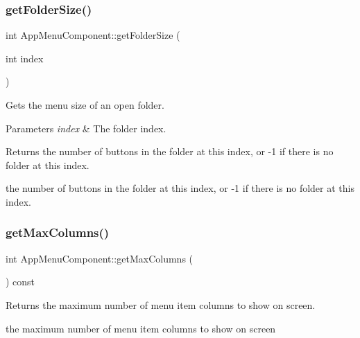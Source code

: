 \subsubsection{\texorpdfstring{get\+Folder\+Size()}{getFolderSize()}}
{\footnotesize\ttfamily int App\+Menu\+Component\+::get\+Folder\+Size (\begin{DoxyParamCaption}\item[{int}]{index }\end{DoxyParamCaption})\hspace{0.3cm}{\ttfamily [protected]}}

Gets the menu size of an open folder.


\begin{DoxyParams}{Parameters}
{\em index} & The folder index.\\
\hline
\end{DoxyParams}
\begin{DoxyReturn}{Returns}
the number of buttons in the folder at this index, or -\/1 if there is no folder at this index.

the number of buttons in the folder at this index, or -\/1 if there is no folder at this index. 
\end{DoxyReturn}
\mbox{\label{classAppMenuComponent_aa389abb2f459a479a732d4c93f339163}} 
\subsubsection{\texorpdfstring{get\+Max\+Columns()}{getMaxColumns()}}
{\footnotesize\ttfamily int App\+Menu\+Component\+::get\+Max\+Columns (\begin{DoxyParamCaption}{ }\end{DoxyParamCaption}) const\hspace{0.3cm}{\ttfamily [protected]}}

\begin{DoxyReturn}{Returns}
the maximum number of menu item columns to show on screen.

the maximum number of menu item columns to show on screen 
\end{DoxyReturn}
\mbox{\label{classAppMenuComponent_a66c23d297d5ce0fe96895310e891189a}} 
